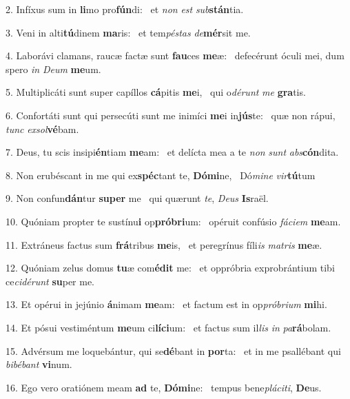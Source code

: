 2. Infíxus sum in \textbf{li}mo pro\textbf{fún}di: \ast\  et \textit{non} \textit{est} \textit{sub}\textbf{stán}tia.\

3. Veni in alti\textbf{tú}dinem \textbf{ma}ris: \ast\  et tem\textit{pés}\textit{tas} \textit{de}\textbf{mér}sit me.\

4. Laborávi clamans, raucæ factæ sunt \textbf{fau}ces \textbf{me}æ: \ast\  defecérunt óculi mei, dum spero \textit{in} \textit{De}\textit{um} \textbf{me}um.\

5. Multiplicáti sunt super capíllos \textbf{cá}pitis \textbf{me}i, \ast\  qui o\textit{dé}\textit{runt} \textit{me} \textbf{gra}tis.\

6. Confortáti sunt qui persecúti sunt me inimíci \textbf{me}i in\textbf{jús}te: \ast\  quæ non rápui, \textit{tunc} \textit{ex}\textit{sol}\textbf{vé}bam.\

7. Deus, tu scis insipi\textbf{én}tiam \textbf{me}am: \ast\  et delícta mea a te \textit{non} \textit{sunt} \textit{abs}\textbf{cón}dita.\

8. Non erubéscant in me qui ex\textbf{spéc}tant te, \textbf{Dó}\textbf{mi}ne, \ast\  Dó\textit{mi}\textit{ne} \textit{vir}\textbf{tú}tum\

9. Non confun\textbf{dán}tur \textbf{su}\textbf{per} me \ast\  qui quærunt \textit{te}, \textit{De}\textit{us} \textbf{Is}raël.\

10. Quóniam propter te sustínu\textbf{i} op\textbf{pró}\textbf{bri}um: \ast\  opéruit confúsio \textit{fá}\textit{ci}\textit{em} \textbf{me}am.\

11. Extráneus factus sum \textbf{frá}tribus \textbf{me}is, \ast\  et peregrínus fíli\textit{is} \textit{ma}\textit{tris} \textbf{me}æ.\

12. Quóniam zelus domus \textbf{tu}æ com\textbf{é}\textbf{dit} me: \ast\  et oppróbria exprobrántium tibi ce\textit{ci}\textit{dé}\textit{runt} \textbf{su}per me.\

13. Et opérui in jejúnio \textbf{á}nimam \textbf{me}am: \ast\  et factum est in op\textit{pró}\textit{bri}\textit{um} \textbf{mi}hi.\

14. Et pósui vestiméntum \textbf{me}um ci\textbf{lí}\textbf{ci}um: \ast\  et factus sum il\textit{lis} \textit{in} \textit{pa}\textbf{rá}bolam.\

15. Advérsum me loquebántur, qui se\textbf{dé}bant in \textbf{por}ta: \ast\  et in me psallébant qui \textit{bi}\textit{bé}\textit{bant} \textbf{vi}num.\

16. Ego vero oratiónem meam \textbf{ad} te, \textbf{Dó}\textbf{mi}ne: \ast\  tempus bene\textit{plá}\textit{ci}\textit{ti}, \textbf{De}us.\

